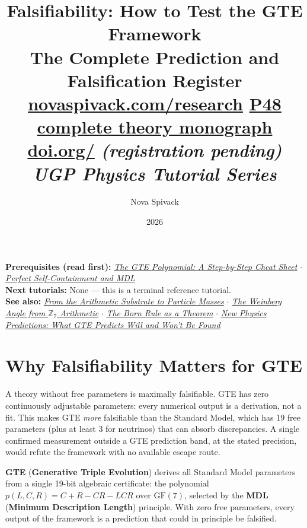 \documentclass[11pt,a4paper]{article}
\date{2026}
\title{\textbf{Falsifiability: How to Test the GTE Framework}\\[6pt]
\large The Complete Prediction and Falsification Register\\[8pt]
\normalsize
\href{https://novaspivack.com/research}{novaspivack.com/research}\texorpdfstring{\quad}{ }
\href{https://doi.org/10.5281/zenodo.20560550}{P48 complete theory monograph}\\[4pt]
\small\href{https://doi.org/\TutorialDOI}{doi.org/\TutorialDOI}
  \textit{(registration pending)}\\[4pt]
\normalsize\textit{UGP Physics Tutorial Series}}
\author{Nova Spivack}
\newcommand{\term}[1]{\textbf{#1}}
\begin{document}
\setcounter{tocdepth}{2}
\maketitle
\tableofcontents
\newpage

\begin{tcolorbox}[colback=blue!6,colframe=blue!40!black,
  title=\textbf{UGP Physics Tutorial Series}]
\textbf{Prerequisites (read first):}
  \href{https://doi.org/10.5281/zenodo.20657889}%
    {\emph{The GTE Polynomial: A Step-by-Step Cheat Sheet}}
  $\cdot$
  \href{https://doi.org/10.5281/zenodo.20657895}%
    {\emph{Perfect Self-Containment and MDL}}\\[4pt]
\textbf{Next tutorials:}
  None --- this is a terminal reference tutorial.\\[4pt]
\textbf{See also:}
  \href{https://doi.org/10.5281/zenodo.20657913}%
    {\emph{From the Arithmetic Substrate to Particle Masses}}
  $\cdot$
  \href{https://doi.org/10.5281/zenodo.20657923}%
    {\emph{The Weinberg Angle from $\mathbb{Z}_7$ Arithmetic}}
  $\cdot$
  \href{https://doi.org/10.5281/zenodo.20657861}%
    {\emph{The Born Rule as a Theorem}}
  $\cdot$
  \href{https://doi.org/10.5281/zenodo.20669152}%
    {\emph{New Physics Predictions: What GTE Predicts Will and Won't Be Found}}
\end{tcolorbox}


\section{Why Falsifiability Matters for GTE}
\label{sec:intro}

\begin{tcolorbox}[colback=boxblue,colframe=blue!40!black,
  title=The core argument]
A theory without free parameters is maximally falsifiable.  GTE has zero
continuously adjustable parameters: every numerical output is a derivation, not
a fit.  This makes GTE \emph{more} falsifiable than the Standard Model, which
has 19 free parameters (plus at least 3 for neutrinos) that can absorb
discrepancies.  A single confirmed measurement outside a GTE prediction band,
at the stated precision, would refute the framework with no available escape
route.
\end{tcolorbox}

\term{GTE} (\term{Generative Triple Evolution}) derives all Standard Model
parameters from a single 19-bit algebraic certificate: the polynomial
$p(L,C,R) = C + R - CR - LCR$ over $\mathrm{GF}(7)$, selected by the
\term{MDL} (\term{Minimum Description Length}) principle.  With zero free
parameters, every output of the framework is a prediction that could in principle
be falsified.
\end{document}
